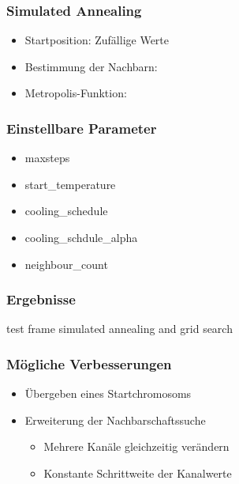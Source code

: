 \begin{frame}
\frametitle{Simulated Annealing}
    \begin{itemize}
        \item Startposition: Zufällige Werte
        \item Bestimmung der Nachbarn:
        \item Metropolis-Funktion:
    \end{itemize}
\end{frame}

\begin{frame}
\frametitle{Einstellbare Parameter}
    \begin{itemize}
        \item maxsteps
        \item start\_temperature
        \item cooling\_schedule
        \item cooling\_schdule\_alpha
        \item neighbour\_count
    \end{itemize}
\end{frame}

\begin{frame}
\frametitle{Ergebnisse}

  test frame simulated annealing and grid search
\end{frame}

\begin{frame}
\frametitle{Mögliche Verbesserungen}
    \begin{itemize}
        \item Übergeben eines Startchromosoms
        \item Erweiterung der Nachbarschaftssuche
            \begin{itemize}
                \item Mehrere Kanäle gleichzeitig verändern
                \item Konstante Schrittweite der Kanalwerte
            \end{itemize}
    \end{itemize}
\end{frame}
